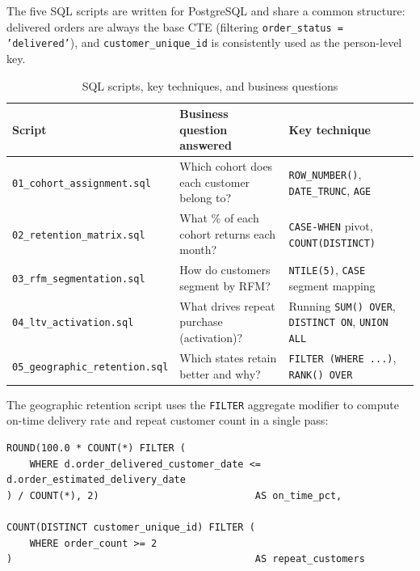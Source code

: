 
The five SQL scripts are written for PostgreSQL and share a common structure:
delivered orders are always the base CTE (filtering \texttt{order\_status =
'delivered'}), and \texttt{customer\_unique\_id} is consistently used as the
person-level key.

\begin{table}[h]
\centering
\caption{SQL scripts, key techniques, and business questions}
\label{tab:sql-scripts}
\begin{tabularx}{\textwidth}{lXl}
\toprule
\textbf{Script} & \textbf{Business question answered} & \textbf{Key technique} \\
\midrule
\texttt{01\_cohort\_assignment.sql} &
  Which cohort does each customer belong to? &
  \texttt{ROW\_NUMBER()}, \texttt{DATE\_TRUNC}, \texttt{AGE} \\
\texttt{02\_retention\_matrix.sql} &
  What \% of each cohort returns each month? &
  \texttt{CASE-WHEN} pivot, \texttt{COUNT(DISTINCT)} \\
\texttt{03\_rfm\_segmentation.sql} &
  How do customers segment by RFM? &
  \texttt{NTILE(5)}, \texttt{CASE} segment mapping \\
\texttt{04\_ltv\_activation.sql} &
  What drives repeat purchase (activation)? &
  Running \texttt{SUM() OVER}, \texttt{DISTINCT ON}, \texttt{UNION ALL} \\
\texttt{05\_geographic\_retention.sql} &
  Which states retain better and why? &
  \texttt{FILTER (WHERE ...)}, \texttt{RANK() OVER} \\
\bottomrule
\end{tabularx}
\end{table}

The geographic retention script uses the \texttt{FILTER} aggregate modifier
to compute on-time delivery rate and repeat customer count in a single pass:

\begin{lstlisting}[style=sql, caption={Conditional aggregation with FILTER (from \filepath{sql/05\_geographic\_retention.sql})}]
ROUND(100.0 * COUNT(*) FILTER (
    WHERE d.order_delivered_customer_date <= d.order_estimated_delivery_date
) / COUNT(*), 2)                           AS on_time_pct,

COUNT(DISTINCT customer_unique_id) FILTER (
    WHERE order_count >= 2
)                                          AS repeat_customers
\end{lstlisting}

